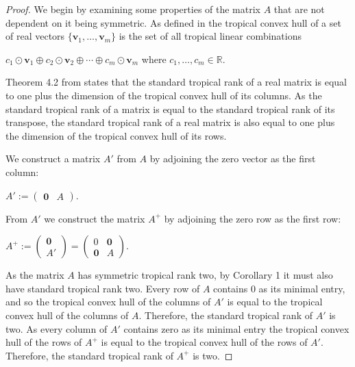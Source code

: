 \documentclass{article}
\begin{document}
\begin{proof}
  We begin by examining some properties of the matrix $A$ that are not dependent on it being symmetric. As defined in \cite{ds} the tropical convex hull of a set of real vectors $\{\textbf{v}_{1},\ldots,\textbf{v}_{m}\}$ is the set of all tropical linear combinations
  
  \begin{center}
    
    $c_{1} \odot \textbf{v}_{1} \oplus c_{2} \odot \textbf{v}_{2} \oplus \cdots \oplus c_{m} \odot \textbf{v}_{m}$ \hspace{.1 in} where $c_{1},\ldots,c_{m} \in \mathbb{R}$.
    
  \end{center}
  
  Theorem 4.2 from \cite{dss} states that the standard tropical rank of a real matrix is equal to one plus the dimension of the tropical convex hull of its columns. As the standard tropical rank of a matrix is equal to the standard tropical rank of its transpose, the standard tropical rank of a real matrix is also equal to one plus the dimension of the tropical convex hull of its rows. 
  
  We construct a matrix $A'$ from $A$ by adjoining the zero vector as the first column:
  
  \begin{center}
    
    $A' := \left(\begin{array}{cc} \textbf{0} & A \end{array}\right)$.
    
  \end{center}
  
  From $A'$ we construct the matrix $A^{+}$ by adjoining the zero row as the first row:
  
  \begin{center}
    
    $A^{+} := \left(\begin{array}{c} \textbf{0} \\ A' \end{array}\right) = \left(\begin{array}{cc} 0 & \textbf{0} \\ \textbf{0} & A \end{array}\right)$.
    
  \end{center}
  
  As the matrix $A$ has symmetric tropical rank two, by Corollary 1 it must also have standard tropical rank two. Every row of $A$ contains $0$ as its minimal entry, and so the tropical convex hull of the columns of $A'$ is equal to the tropical convex hull of the columns of $A$. Therefore, the standard tropical rank of $A'$ is two. As every column of $A'$ contains zero as its minimal entry the tropical convex hull of the rows of $A^{+}$ is equal to the tropical convex hull of the rows of $A'$. Therefore, the standard tropical rank of $A^{+}$ is two.


\end{proof}
\end{document}
